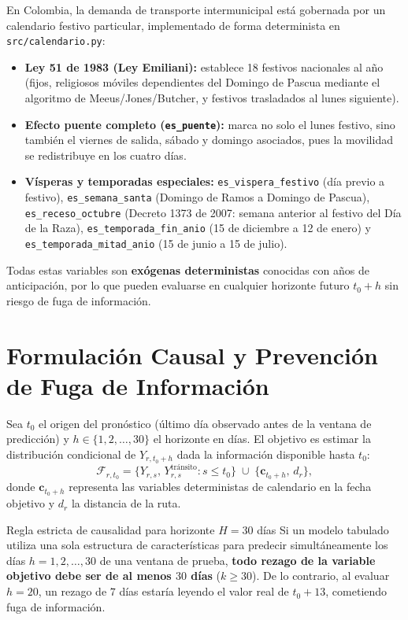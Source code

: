 \documentclass[11pt,a4paper]{article}
\begin{document}
En Colombia, la demanda de transporte intermunicipal está gobernada por un calendario festivo particular, implementado de forma determinista en \texttt{src/calendario.py}:
\begin{itemize}[leftmargin=1.5em]
    \item \textbf{Ley 51 de 1983 (Ley Emiliani):} establece 18 festivos nacionales al año (fijos, religiosos móviles dependientes del Domingo de Pascua mediante el algoritmo de Meeus/Jones/Butcher, y festivos trasladados al lunes siguiente).
    \item \textbf{Efecto puente completo (\texttt{es\_puente}):} marca no solo el lunes festivo, sino también el viernes de salida, sábado y domingo asociados, pues la movilidad se redistribuye en los cuatro días.
    \item \textbf{Vísperas y temporadas especiales:} \texttt{es\_vispera\_festivo} (día previo a festivo), \texttt{es\_semana\_santa} (Domingo de Ramos a Domingo de Pascua), \texttt{es\_receso\_octubre} (Decreto 1373 de 2007: semana anterior al festivo del Día de la Raza), \texttt{es\_temporada\_fin\_anio} (15 de diciembre a 12 de enero) y \texttt{es\_temporada\_mitad\_anio} (15 de junio a 15 de julio).
\end{itemize}
Todas estas variables son \textbf{exógenas deterministas} conocidas con años de anticipación, por lo que pueden evaluarse en cualquier horizonte futuro $t_0 + h$ sin riesgo de fuga de información.

\section{Formulación Causal y Prevención de Fuga de Información}

Sea $t_0$ el origen del pronóstico (último día observado antes de la ventana de predicción) y $h \in \{1, 2, \dots, 30\}$ el horizonte en días. El objetivo es estimar la distribución condicional de $Y_{r, t_0+h}$ dada la información disponible hasta $t_0$:
\[
\mathcal{F}_{r, t_0} = \big\{ Y_{r, s},\, Y^{\text{tránsito}}_{r, s} : s \le t_0 \big\} \;\cup\; \big\{ \mathbf{c}_{t_0+h},\, d_r \big\},
\]
donde $\mathbf{c}_{t_0+h}$ representa las variables deterministas de calendario en la fecha objetivo y $d_r$ la distancia de la ruta.

\begin{cajaConcepto}{Regla estricta de causalidad para horizonte $H=30$ días}
Si un modelo tabulado utiliza una sola estructura de características para predecir simultáneamente los días $h = 1, 2, \dots, 30$ de una ventana de prueba, \textbf{todo rezago de la variable objetivo debe ser de al menos $30$ días} ($k \ge 30$). De lo contrario, al evaluar $h = 20$, un rezago de $7$ días estaría leyendo el valor real de $t_0 + 13$, cometiendo fuga de información.
\end{cajaConcepto}
\end{document}
